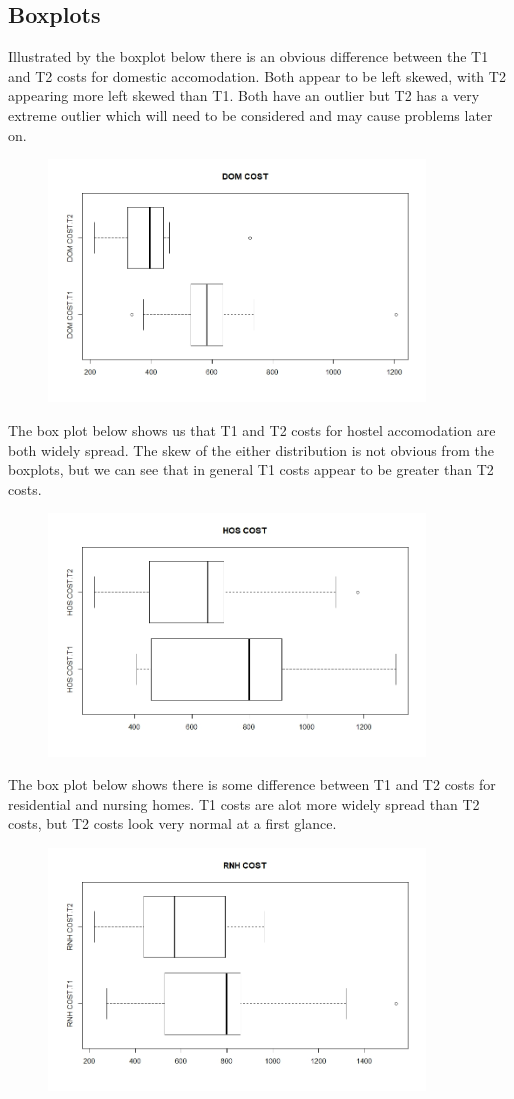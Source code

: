 \documentclass[]{article}
\begin{document}
\subsection{Boxplots}
Illustrated by the boxplot below there is an obvious difference between the T1 and T2 costs for domestic accomodation. Both appear to be left skewed, with T2 appearing more left skewed than T1. Both have an outlier but T2 has a very extreme outlier which will need to be considered and may cause problems later on.
\begin{figure}[H]
\centering
\includegraphics[width=10cm]{RStudio/jpeg/Box_DOM.jpeg}
\end{figure}
The box plot below shows us that T1 and T2 costs for hostel accomodation are both widely spread. The skew of the either distribution is not obvious from the boxplots, but we can see that in general T1 costs appear to be greater than T2 costs.
\begin{figure}[H]
\centering
\includegraphics[width=10cm]{RStudio/jpeg/Box_HOS.jpeg}
\end{figure}
The box plot below shows there is some difference between T1 and T2 costs for residential and nursing homes. T1 costs are alot more widely spread than T2 costs, but T2 costs look very normal at a first glance.
\begin{figure}[H]
\centering
\includegraphics[width=10cm]{RStudio/jpeg/Box_RNH.jpeg}
\end{figure}
\end{document}
